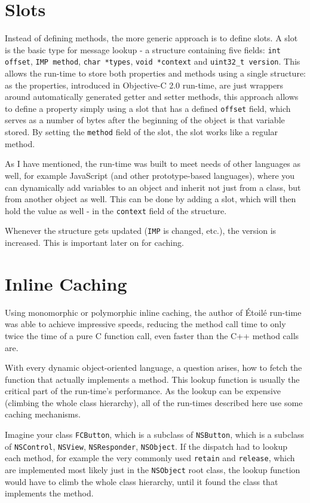 \section{Slots}
Instead of defining methods, the more generic approach is to define slots. A slot is the basic type for message lookup - a structure containing five fields: \verb=int offset=, \verb=IMP method=, \verb=char *types=, \verb=void *context= and \verb=uint32_t version=. This allows the run-time to store both properties and methods using a single structure: as the properties, introduced in Objective-C 2.0 run-time, are just wrappers around automatically generated getter and setter methods, this approach allows to define a property simply using a slot that has a defined \verb=offset= field, which serves as a number of bytes after the beginning of the object is that variable stored. By setting the \verb=method= field of the slot, the slot works like a regular method.

As I have mentioned, the run-time was built to meet needs of other languages as well, for example JavaScript (and other prototype-based languages), where you can dynamically add variables to an object and inherit not just from a class, but from another object as well. This can be done by adding a slot, which will then hold the value as well - in the \verb=context= field of the structure.

Whenever the structure gets updated (\verb=IMP= is changed, etc.), the version is increased. This is important later on for caching.


\section{Inline Caching}
Using monomorphic or polymorphic inline caching, the author of \'Etoil\'e run-time was able to achieve impressive speeds, reducing the method call time to only twice the time of a pure C function call, even faster than the C++ method calls are.

With every dynamic object-oriented language, a question arises, how to fetch the function that actually implements a method. This lookup function is usually the critical part of the run-time's performance. As the lookup can be expensive (climbing the whole class hierarchy), all of the run-times described here use some caching mechanisms.

Imagine your class \verb=FCButton=, which is a subclass of \verb=NSButton=, which is a subclass of \verb=NSControl=, \verb=NSView=, \verb=NSResponder=, \verb=NSObject=. If the dispatch had to lookup each method, for example the very commonly used \verb=retain= and \verb=release=, which are implemented most likely just in the \verb=NSObject= root class, the lookup function would have to climb the whole class hierarchy, until it found the class that implements the method.

